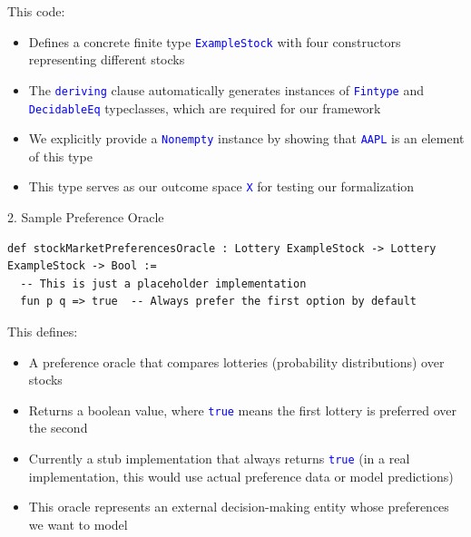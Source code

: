 \documentclass{article}
\theoremstyle{definition}
\newcommand{\tactic}[1]{\textcolor{blue}{\texttt{#1}}}
\begin{document}
This code:
\begin{itemize}
  \item Defines a concrete finite type \tactic{ExampleStock} with four constructors representing different stocks
  \item The \tactic{deriving} clause automatically generates instances of \tactic{Fintype} and \tactic{DecidableEq} typeclasses, which are required for our framework
  \item We explicitly provide a \tactic{Nonempty} instance by showing that \tactic{AAPL} is an element of this type
  \item This type serves as our outcome space \tactic{X} for testing our formalization
\end{itemize}

2. Sample Preference Oracle
\begin{lstlisting}
def stockMarketPreferencesOracle : Lottery ExampleStock -> Lottery ExampleStock -> Bool :=
  -- This is just a placeholder implementation
  fun p q => true  -- Always prefer the first option by default
\end{lstlisting}

This defines:
\begin{itemize}
  \item A preference oracle that compares lotteries (probability distributions) over stocks
  \item Returns a boolean value, where \tactic{true} means the first lottery is preferred over the second
  \item Currently a stub implementation that always returns \tactic{true} (in a real implementation, this would use actual preference data or model predictions)
  \item This oracle represents an external decision-making entity whose preferences we want to model
\end{itemize}
\end{document}
